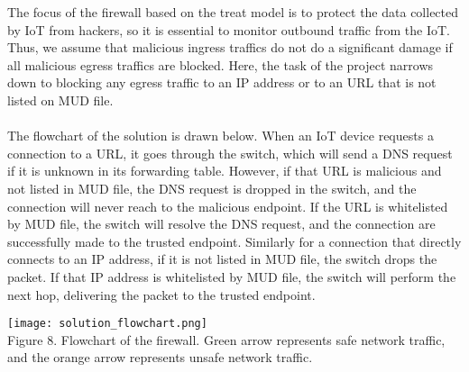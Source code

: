 The focus of the firewall based on the treat model is to protect the data collected by IoT from hackers, so it is essential to monitor outbound traffic from the IoT. Thus, we assume that malicious ingress traffics do not do a significant damage if all malicious egress traffics are blocked. Here, the task of the project narrows down to blocking any egress traffic to an IP address or to an URL that is not listed on MUD file. \\
\\
The flowchart of the solution is drawn below. When an IoT device requests a connection to a URL, it goes through the switch, which will send a DNS request if it is unknown in its forwarding table. However, if that URL is malicious and not listed in MUD file, the DNS request is dropped in the switch, and the connection will never reach to the malicious endpoint. If the URL is whitelisted by MUD file, the switch will resolve the DNS request, and the connection are successfully made to the trusted endpoint. Similarly for a connection that directly connects to an IP address, if it is not listed in MUD file, the switch drops the packet. If that IP address is whitelisted by MUD file, the switch will perform the next hop, delivering the packet to the trusted endpoint.

\texttt{[image: solution\_flowchart.png]}\\
Figure 8. Flowchart of the firewall. Green arrow represents safe network traffic, and the orange arrow represents unsafe network traffic.
\\
